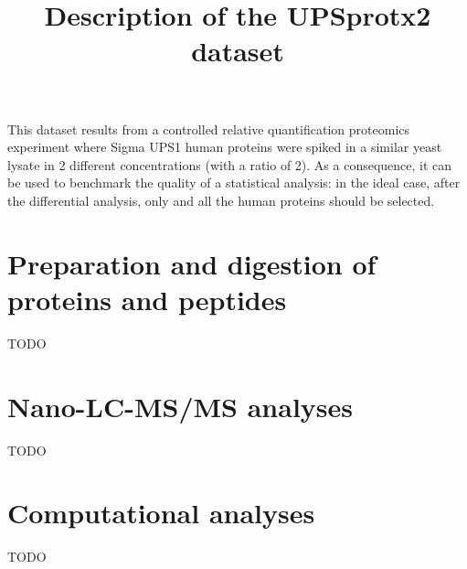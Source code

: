 \documentclass[12pt,a4paper]{article}
\begin{document}

\title{Description of the UPSprotx2 dataset}
\author{}
\maketitle





This dataset results from a controlled relative quantification proteomics experiment where Sigma UPS1 human proteins were spiked in a similar yeast lysate in 2 different concentrations (with a ratio of 2).
As a consequence, it can be used to benchmark the quality of a statistical analysis: in the ideal case, after the differential analysis, only and all the human proteins should be selected.

\section{Preparation and digestion of proteins and peptides}
TODO

\section{Nano-LC-MS/MS analyses}
TODO

\section{Computational analyses}
TODO
\end{document}
